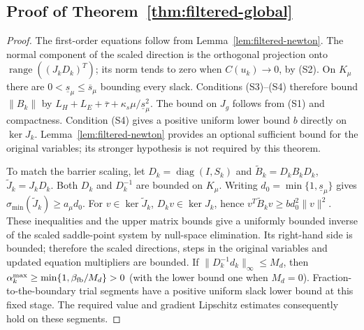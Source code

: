 \documentclass[pdflatex,sn-mathphys-num]{sn-jnl}
\theoremstyle{thmstyleone}
\theoremstyle{thmstylethree}
\newcommand{\diag}{\operatorname{diag}}
\begin{document}
\subsection{Proof of Theorem~\ref{thm:filtered-global}}
\begin{proof}
The first-order equations follow from
Lemma~\ref{lem:filtered-newton}. The normal component of the scaled
direction is the orthogonal projection onto
$\operatorname{range}((J_kD_k)^T)$; its norm tends to zero when
$C(u_k)\to0$, by (S2).
On $K_\mu$ there are $0<\underline s_\mu\leq\overline s_\mu$
bounding every slack. Conditions (S3)--(S4) therefore bound
$\|B_k\|$ by
$L_H+L_E+\overline\tau+
 \kappa_s\mu/\underline s_\mu^2$.
The bound on $J_g$ follows from (S1) and compactness.
Condition (S4) gives a positive uniform lower bound $b$
directly on $\ker J_k$. Lemma~\ref{lem:filtered-newton} provides an
optional sufficient bound for the original variables; its stronger hypothesis is
not required by this theorem.

To match the barrier scaling, let $D_k=\diag(I,S_k)$ and
$\widetilde B_k=D_kB_kD_k$,
$\widetilde J_k=J_kD_k$.
Both $D_k$ and $D_k^{-1}$ are bounded on $K_\mu$.
Writing $d_0=\min\{1,\underline s_\mu\}$ gives
$\sigma_{\min}(\widetilde J_k)\geq a_\mu d_0$.
For $v\in\ker\widetilde J_k$,
$D_kv\in\ker J_k$, hence
$v^T\widetilde B_kv\geq b d_0^2\|v\|^2$.
These inequalities and the upper matrix bounds give a uniformly
bounded inverse of the scaled saddle-point system by null-space
elimination. Its right-hand side is bounded; therefore the scaled
directions, steps in the original variables and updated equation multipliers
are bounded. If $\|D_k^{-1}d_k\|_\infty\leq M_d$, then
$\alpha_k^{\max}\geq\min\{1,\beta_{\rm fb}/M_d\}>0$
(with the lower bound one when $M_d=0$).
Fraction-to-the-boundary trial segments have a
positive uniform slack lower bound at this fixed stage.
The required value and gradient Lipschitz estimates consequently
hold on these segments.


\end{proof}
\end{document}

